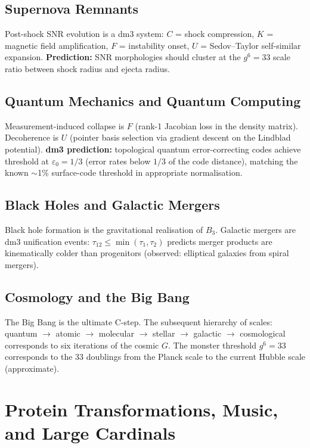 \documentclass[11pt, twoside, openright]{book}
\theoremstyle{plain}
\theoremstyle{definition}
\newcommand{\eps}{\varepsilon_0}
\begin{document}
\section{Supernova Remnants}

Post-shock SNR evolution is a dm3 system:
$C$ = shock compression, $K$ = magnetic field amplification,
$F$ = instability onset, $U$ = Sedov--Taylor self-similar expansion.
\textbf{Prediction:} SNR morphologies should cluster at the $g^6 = 33$
scale ratio between shock radius and ejecta radius.

\section{Quantum Mechanics and Quantum Computing}

Measurement-induced collapse is $F$ (rank-1 Jacobian loss in the
density matrix). Decoherence is $U$ (pointer basis selection via
gradient descent on the Lindblad potential). \textbf{dm3 prediction:}
topological quantum error-correcting codes achieve threshold at
$\eps = 1/3$ (error rates below $1/3$ of the code distance),
matching the known $\sim$1\% surface-code threshold in appropriate
normalisation.

\section{Black Holes and Galactic Mergers}

Black hole formation is the gravitational realisation of $B_3$.
Galactic mergers are dm3 unification events: $\tau_{12} \le
\min(\tau_1, \tau_2)$ predicts merger products are kinematically
colder than progenitors (observed: elliptical galaxies from spiral
mergers).

\section{Cosmology and the Big Bang}

The Big Bang is the ultimate C-step. The subsequent hierarchy of
scales: quantum $\to$ atomic $\to$ molecular $\to$ stellar $\to$
galactic $\to$ cosmological corresponds to six iterations of the
cosmic $G$. The monster threshold $g^6 = 33$ corresponds to the 33
doublings from the Planck scale to the current Hubble scale
(approximate).

\chapter{Protein Transformations, Music, and Large Cardinals}
\end{document}
